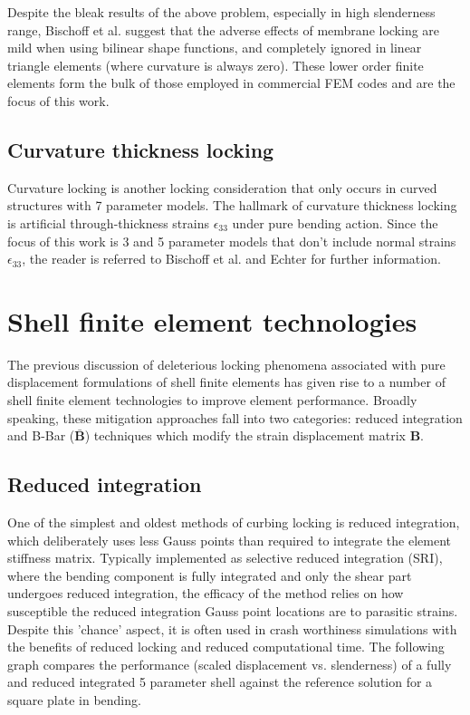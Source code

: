 Despite the bleak results of the above problem, especially in high slenderness range, Bischoff et al. \cite{BischLitBook04} suggest that the adverse effects of membrane locking are mild when using bilinear shape functions, and completely ignored in linear triangle elements (where curvature is always zero). These lower order finite elements form the bulk of those employed in commercial FEM codes and are the focus of this work.

\subsection{Curvature thickness locking}

Curvature locking is another locking consideration that only occurs in curved structures with 7 parameter models. The hallmark of curvature thickness locking is artificial through-thickness strains $\epsilon_{33}$ under pure bending action. Since the focus of this work is 3 and 5 parameter models that don't include normal strains $\epsilon_{33}$, the reader is referred to Bischoff et al. \cite{BischLitBook04} and Echter \cite{Echter13} for further information.

\section{Shell finite element technologies}
\label{FE_tech}

The previous discussion of deleterious locking phenomena associated with pure displacement formulations of shell finite elements has given rise to a number of shell finite element technologies to improve element performance. Broadly speaking, these mitigation approaches fall into two categories: reduced integration and B-Bar ($\bar{\mathbf{B}}$) techniques which modify the strain displacement matrix $\mathbf{B}$. 

\subsection{Reduced integration}

One of the simplest and oldest methods of curbing locking is reduced integration, which deliberately uses less Gauss points than required to integrate the element stiffness matrix. Typically implemented as selective reduced integration (SRI), where the bending component is fully integrated and only the shear part undergoes reduced integration, the efficacy of the method relies on how susceptible the reduced integration Gauss point locations are to parasitic strains. Despite this 'chance' aspect, it is often used in crash worthiness simulations with the benefits of reduced locking and reduced computational time. The following graph compares the performance (scaled displacement vs. slenderness) of a fully and reduced integrated 5 parameter shell against the reference solution for a square plate in bending.

